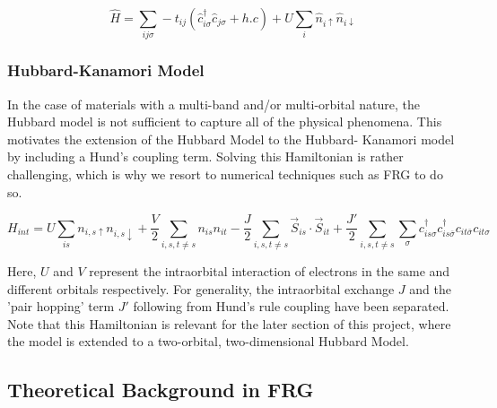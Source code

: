 \documentclass[12pt]{article}
\begin{document}
\begin{equation}\label{t Hubbard model}
    \hat{H} = \sum_{ij\sigma} -t_{ij}(\hat{c}_{i\sigma}^{\dagger}\hat{c}_{j \sigma} + h.c) 
    + U \sum_{i} \hat{n}_{i \uparrow} \hat{n}_{i \downarrow}
\end{equation}





\subsubsection{Hubbard-Kanamori Model}
In the case of materials with a multi-band and/or multi-orbital nature, the Hubbard model is not sufficient to capture all of the physical phenomena. This motivates the extension of the Hubbard Model to the Hubbard- Kanamori model by including a Hund's coupling term.
Solving this Hamiltonian is rather challenging, which is why we resort to numerical techniques such as FRG to do so. 

\begin{equation} \label{Hubbard-Kanamori Model}
    H_{int} = U \sum_{is}n_{i,s\uparrow}n_{i,s\downarrow} + \frac{V}{2} \sum_{i,s,t \neq s} n_{is}n_{it} -\frac{J}{2} \sum_{i,s,t \neq s} \vec{S}_{is} \cdot \vec{S}_{it} 
    + \frac{J'}{2} \sum_{i,s,t \neq s} \sum_{\sigma} c_{is\sigma}^{\dagger}c_{is\bar{\sigma}}^{\dagger}c_{it\bar{\sigma}}c_{it\sigma}
\end{equation}

Here, $U$ and $V$ represent the intraorbital interaction of electrons in the same and different orbitals respectively. For generality, the intraorbital exchange $J$ and the 'pair hopping' term $J'$ following from Hund's rule coupling have been separated.  
Note that this Hamiltonian is relevant for the later section of this project, where the model is extended to a two-orbital, two-dimensional Hubbard Model.

\subsection{Theoretical Background in FRG}
\end{document}
